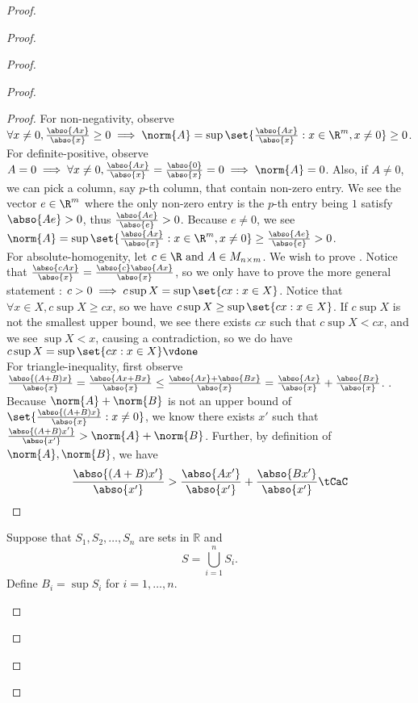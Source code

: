 \documentclass{report}
\begin{document}
\begin{proof}
\begin{proof}
\begin{proof}
\begin{proof}
\begin{proof}
For non-negativity, observe $\forall x\neq 0,\frac{\abso{Ax}}{\abso{x}}\geq 0 \implies \norm{A}=\sup \set{\frac{\abso{Ax}}{\abso{x}}:x \in \R^m, x\neq 0}\geq 0$.\\

For definite-positive, observe $A=0\implies \forall x\neq 0, \frac{\abso{Ax}}{\abso{x}}=\frac{\abso{0}}{\abso{x}}=0\implies \norm{A}=0$. Also, if $A\neq 0$, we can pick a column, say $p$-th column, that contain non-zero entry. We see the vector $e\in \R^m$ where the only non-zero entry is the  $p$-th entry being $1$ satisfy $\abso{Ae}>0$, thus $\frac{\abso{Ae}}{\abso{e}}>0$. Because $e\neq 0$, we see $\norm{A}=\sup \set{\frac{\abso{Ax}}{\abso{x}}:x\in\R^m,x\neq 0}\geq \frac{\abso{Ae}}{\abso{e}}>0$.\\

For absolute-homogenity, let $c \in \R\text{ and }A\in M_{n\times m}$. We wish to prove . Notice that $\frac{\abso{cAx}}{\abso{x}}=\frac{\abso{c}\abso{Ax}}{\abso{x}}$, so we only have to prove the more general statement : $c>0 \implies c \sup X= \sup \set{cx:x\in X}$. Notice that $\forall x \in X, c \sup X\geq cx$, so we have $c\sup X\geq \sup \set{cx:x\in X}$. If $c\sup X$ is not the smallest upper bound, we see there exists $cx$ such that $c\sup X<cx$, and we see $\sup X<x$, causing a contradiction, so we do have $c\sup X=\sup \set{cx:x\in X}\vdone$   \\

For triangle-inequality, first observe $\frac{\abso{(A+B)x}}{\abso{x}}=\frac{\abso{Ax+Bx}}{\abso{x}}\leq \frac{\abso{Ax}+\abso{Bx}}{\abso{x}}=\frac{\abso{Ax}}{\abso{x}}+\frac{\abso{Bx}}{\abso{x}}$. .\\

Because $\norm{A}+\norm{B}$ is not an upper bound of $\set{\frac{\abso{(A+B)x}}{\abso{x}}:x\neq 0}$, we know there exists $x'$ such that  $\frac{\abso{(A+B)x'}}{\abso{x'}}>\norm{A}+\norm{B}$. Further, by definition of $\norm{A},\norm{B}$, we have
\begin{equation}
\frac{\abso{(A+B)x'}}{\abso{x'}}>\frac{\abso{Ax'}}{\abso{x'}}+\frac{\abso{Bx'}}{\abso{x'}}\tCaC
\end{equation}
\end{proof}

\begin{question}{}{}
Suppose that \(S_1, S_2, \ldots, S_n\) are sets in \(\mathbb{R}\) and 
\[ S = \bigcup_{i=1}^{n} S_i. \]
Define \(B_i = \sup S_i\) for \(i = 1, \ldots, n\).


\end{question}
\end{proof}
\end{proof}
\end{proof}
\end{proof}
\end{document}
